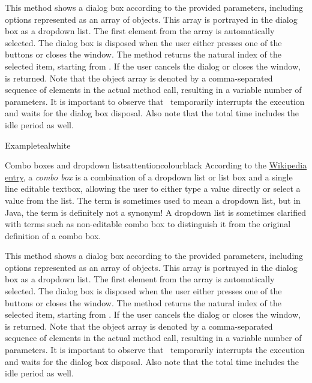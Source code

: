 \begin{description}
This method shows a dialog box according to the provided parameters, including options represented as an array of  objects. This array is portrayed in the dialog box as a dropdown list. The first element from the array is automatically selected. The dialog box is disposed when the user either presses one of the buttons or closes the window. The method returns the natural index of the selected item, starting from . If the user cancels the dialog or closes the window,  is returned.  Note that the object array is denoted by a comma-separated sequence of elements in the actual method call, resulting in a variable number of parameters. It is important to observe that \arara\ temporarily interrupts the execution and waits for the dialog box disposal. Also note that the total time includes the idle period as well.

\begin{codebox}{Example}{teal}{\icnote}{white}
\end{codebox}

\begin{messagebox}{Combo boxes and dropdown lists}{attentioncolour}{\icattention}{black}
According to the \href{https://en.wikipedia.org/wiki/Combo_box}{Wikipedia entry}, a \emph{combo box} is a combination of a dropdown list or list box and a single line editable textbox, allowing the user to either type a value directly or select a value from the list. The term is sometimes used to mean a dropdown list, but in Java, the term is definitely not a synonym! A dropdown list is sometimes clarified with terms such as non-editable combo box to distinguish it from the original definition of a combo box.
\end{messagebox}

\item[\mddbox{C}{R}{\parbox{0.49\textwidth}{showDropdown(int icon, String title,\\\hspace*{1em} String text, Object... options)}}{int}]

This method shows a dialog box according to the provided parameters, including options represented as an array of  objects. This array is portrayed in the dialog box as a dropdown list. The first element from the array is automatically selected. The dialog box is disposed when the user either presses one of the buttons or closes the window. The method returns the natural index of the selected item, starting from . If the user cancels the dialog or closes the window,  is returned.  Note that the object array is denoted by a comma-separated sequence of elements in the actual method call, resulting in a variable number of parameters. It is important to observe that \arara\ temporarily interrupts the execution and waits for the dialog box disposal. Also note that the total time includes the idle period as well.


\end{description}
